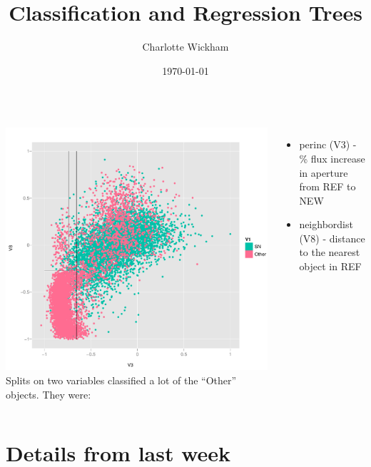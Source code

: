 \documentclass{beamer}
\title{Classification and Regression Trees}
\author{Charlotte Wickham}
\date{\today}
\begin{document}
\frame{\titlepage}

\section[Outline]{ 	}
\frame{\tableofcontents}

\begin{frame}
	\frametitle{}
	\begin{columns}[c] 
			\includegraphics{leftside.pdf}
			Splits on two variables classified a lot of the ``Other'' objects.
			They were:
			\begin{itemize}
				\item perinc (V3) - \% flux increase in aperture from REF to NEW 
			 	\item neighbordist (V8) - distance to the nearest object in REF 
			\end{itemize}		
	\end{columns}
	\end{frame}

\section{Details from last week}
\end{document}
